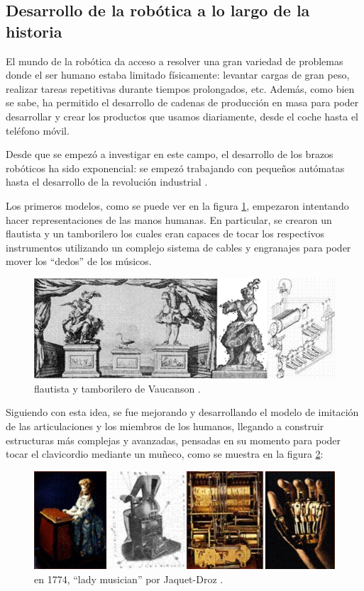 \subsection{Desarrollo de la robótica a lo largo de la historia}

El mundo de la robótica da acceso a resolver una gran variedad de problemas donde el ser humano estaba
limitado físicamente: levantar cargas de gran peso, realizar tareas repetitivas durante tiempos
prolongados, etc. Además, como bien se sabe, ha permitido el desarrollo de cadenas de producción en
masa para poder desarrollar y crear los productos que usamos diariamente, desde el coche hasta el 
teléfono móvil.

Desde que se empezó a investigar en este campo, el desarrollo de los brazos robóticos ha sido 
exponencial: se empezó trabajando con pequeños autómatas hasta el desarrollo de la revolución
industrial \cite{moran_evolution_2007}.

Los primeros modelos, como se puede ver en la figura \ref{fig:evolution}, empezaron intentando hacer
representaciones de las manos humanas. En particular, se crearon un flautista y un tamborilero los
cuales eran capaces de tocar los respectivos instrumentos utilizando un complejo sistema de cables y 
engranajes para poder mover los ``dedos'' de los músicos.

\begin{figure}[H]
    \centering
    \includegraphics[width=.75\linewidth]{pictures/evolution_of_robotic_arms.png}
    \caption{flautista y tamborilero de Vaucanson \cite{vaucanson_mecanisme_1738}.}
    \label{fig:evolution}
\end{figure}

Siguiendo con esta idea, se fue mejorando y desarrollando el modelo de imitación de las articulaciones
y los miembros de los humanos, llegando a construir estructuras más complejas y avanzadas, pensadas en 
su momento para poder tocar el clavicordio mediante un muñeco, como se muestra en la figura 
\ref{fig:lady_musician}:

\begin{figure}[H]
    \centering
    \includegraphics[width=.8\linewidth]{pictures/reproduction_of_lady_musician.png}
    \caption{en 1774, ``lady musician'' por Jaquet-Droz \cite{chapuis_alfred_and_droz_edmond_automata_1958}.}
    \label{fig:lady_musician}
\end{figure}

